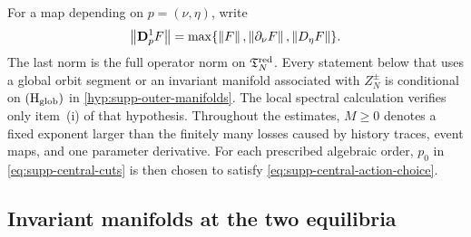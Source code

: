 For a map depending on \(p=(\nu,\eta)\), write
\[
 \left\lVert\mathbf D_p^1F\right\rVert
 =\max\{\left\lVert F\right\rVert,\left\lVert\partial_\nu F\right\rVert,\left\lVert D_\eta F\right\rVert\}.
\]
The last norm is the full operator norm on
\(\mathfrak T_N^{\rm red}\).
Every statement below that uses a global orbit segment or an invariant
manifold associated with \(Z_N^\pm\) is conditional on
\(\mathrm{(H_{\rm glob})}\) in
\cref{hyp:supp-outer-manifolds}.  The local spectral calculation verifies
only item~\textup{(i)} of that hypothesis.
Throughout the estimates, \(M\ge0\) denotes a fixed exponent larger than
the finitely many losses caused by history traces, event maps, and one
parameter derivative.  For each prescribed algebraic order, \(p_0\) in
\cref{eq:supp-central-cuts} is then chosen to satisfy
\cref{eq:supp-central-action-choice}.

\subsection{Invariant manifolds at the two equilibria}

